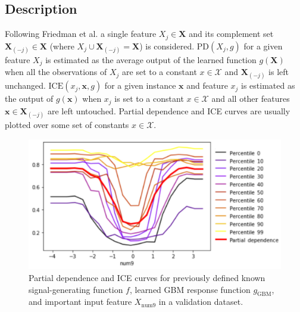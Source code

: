\documentclass[sigconf, review]{acmart}
\begin{document}
\subsection{Description}
	
Following Friedman et al. a single feature $X_j \in \mathbf{X}$ and its complement set $\mathbf{X}_{(-j)} \in \mathbf{X}$ (where $X_j \cup \mathbf{X}_{(-j)} = \mathbf{X}$) is considered. $\text{PD}(X_j, g)$ for a given feature $X_j$ is estimated as the average output of the learned function $g(\mathbf{X})$ when all the observations of $X_j$ are set to a constant $x \in \mathcal{X}$ and $\mathbf{X}_{(-j)}$ is left unchanged. $\text{ICE}(x_j, \mathbf{x}, g)$ for a given instance $\mathbf{x}$ and feature $x_j$ is estimated as the output of $g(\mathbf{x})$ when $x_j$ is set to a constant $x \in \mathcal{X}$ and all other features $\mathbf{x} \in \mathbf{X}_{(-j)}$ are left untouched. Partial dependence and ICE curves are usually plotted over some set of constants $x \in \mathcal{X}$. 

\begin{figure}[htb]
	\begin{center}
		\includegraphics[scale=0.45]{img/figure_4-eps-converted-to.pdf}
		\caption{Partial dependence and ICE curves for previously defined known signal-generating function $f$,  learned GBM response function $g_{\text{GBM}}$, and important input feature $X_{\text{num}9}$ in a validation dataset.}
		\label{fig:pdp_ice}
	\end{center}
\end{figure}
\end{document}
